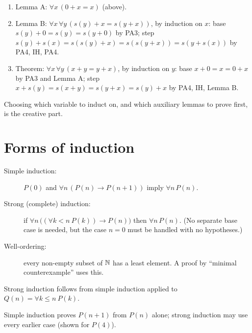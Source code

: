 \begin{example}
\begin{enumerate}
  \item Lemma A: $\forall x\,(0+x=x)$ (above).
  \item Lemma B: $\forall x\,\forall y\,(s(y)+x=s(y+x))$, by induction on $x$:
        base $s(y)+0=s(y)=s(y+0)$ by PA3; step
        $s(y)+s(x)=s(s(y)+x)=s(s(y+x))=s(y+s(x))$ by PA4, IH, PA4.
  \item Theorem: $\forall x\,\forall y\,(x+y=y+x)$, by induction on $y$:
        base $x+0=x=0+x$ by PA3 and Lemma A; step
        $x+s(y)=s(x+y)=s(y+x)=s(y)+x$ by PA4, IH, Lemma B.
\end{enumerate}
Choosing which variable to induct on, and which auxiliary lemmas to prove first, is the
creative part.
\end{example}

\section{Forms of induction}

\begin{important}
\begin{description}
  \item[Simple induction:] $P(0)$ and $\forall n\,(P(n)\to P(n+1))$ imply $\forall n\,P(n)$.
  \item[Strong (complete) induction:] if $\forall n\,\big((\forall k<n\ P(k))\to P(n)\big)$
        then $\forall n\,P(n)$. (No separate base case is needed, but the case $n=0$ must
        be handled with no hypotheses.)
  \item[Well-ordering:] every non-empty subset of $\mathbb{N}$ has a least element. A proof by
        ``minimal counterexample'' uses this.
\end{description}
Strong induction follows from simple induction applied to $Q(n)=\forall k\le n\ P(k)$.
\end{important}

\begin{center}

\small Simple induction proves $P(n+1)$ from $P(n)$ alone; strong induction may use every
earlier case (shown for $P(4)$).
\end{center}

